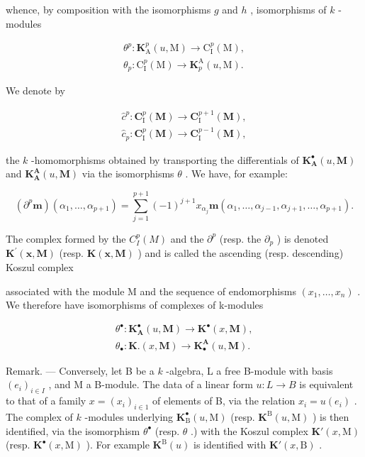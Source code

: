 whence, by composition with the isomorphisms \(g\) and \(h\) , isomorphisms of \(k\) -modules

\[
\begin{array}{l} \theta^ {p}: \mathbf {K} _ {\mathrm{A}} ^ {p} (u, \mathrm{M}) \to \mathrm{C} _ {\mathrm{I}} ^ {p} (\mathrm{M}), \\ \theta_ {p}: \mathrm{C} _ {\mathrm{I}} ^ {p} (\mathrm{M}) \to \mathbf {K} _ {p} ^ {\mathrm{A}} (u, \mathrm{M}). \end{array}
\]

We denote by

\[
\begin{array}{l} \hat {c} ^ {p}: \mathbf {C} _ {\mathrm{I}} ^ {p} (\mathbf {M}) \to \mathbf {C} _ {\mathrm{I}} ^ {p + 1} (\mathbf {M}), \\ \hat {c} _ {p}: \mathbf {C} _ {\mathrm{I}} ^ {p} (\mathbf {M}) \to \mathbf {C} _ {\mathrm{I}} ^ {p - 1} (\mathbf {M}), \end{array}
\]

the \(k\) -homomorphisms obtained by transporting the differentials of \(\mathbf{K}_{\mathbf{A}}^{\bullet}(u, \mathbf{M})\) and \(\mathbf{K}_{\mathbf{A}}^{\mathbf{A}}(u, \mathbf{M})\) via the isomorphisms \(\theta\) . We have, for example:

\[
\left(\partial^ {p} \boldsymbol {m}\right) \left(\alpha_ {1}, \dots , \alpha_ {p + 1}\right) = \sum_ {j = 1} ^ {p + 1} (- 1) ^ {j + 1} x _ {\alpha_ {j}} \boldsymbol {m} \left(\alpha_ {1}, \dots , \alpha_ {j - 1}, \alpha_ {j + 1}, \dots , \alpha_ {p + 1}\right).\tag{12}
\]

The complex formed by the \(C_{I}^{p}(M)\) and the \(\partial^{p}\) (resp. the \(\partial_{p}\) ) is denoted \(\mathbf{K}^{\prime}(\mathbf{x},\mathbf{M})\) (resp. \(\mathbf{K}(\mathbf{x},\mathbf{M})\) ) and is called the ascending (resp. descending) Koszul complex

associated with the module M and the sequence of endomorphisms \((x_{1}, \ldots, x_{n})\) . We therefore have isomorphisms of complexes of k-modules

\[
\begin{array}{l} \theta^ {\bullet}: \mathbf {K} _ {\mathbf {A}} ^ {\bullet} (u, \mathbf {M}) \to \mathbf {K} ^ {\bullet} (x, \mathbf {M}), \\ \theta_ {\bullet}: \mathbf {K}. (x, \mathbf {M}) \to \mathbf {K} _ {\bullet} ^ {\mathbf {A}} (u, \mathbf {M}). \end{array}
\]

Remark. --- Conversely, let B be a \(k\) -algebra, L a free B-module with basis \((e_i)_{i \in I}\) , and M a B-module. The data of a linear form \(u: L \to B\) is equivalent to that of a family \(x = (x_i)_{i \in 1}\) of elements of B, via the relation \(x_i = u(e_i)\) . The complex of \(k\) -modules underlying \(\mathbf{K}_{\mathrm{B}}^{\bullet}(u, \mathrm{M})\) (resp. \(\mathbf{K}^{\mathrm{B}}(u, \mathrm{M})\) ) is then identified, via the isomorphism \(\theta^{\bullet}\) (resp. \(\theta\) .) with the Koszul complex \(\mathbf{K}'(x, \mathrm{M})\) (resp. \(\mathbf{K}^{\bullet}(x, \mathrm{M})\) ). For example \(\mathbf{K}^{\mathrm{B}}(u)\) is identified with \(\mathbf{K}'(x, \mathrm{B})\) .


